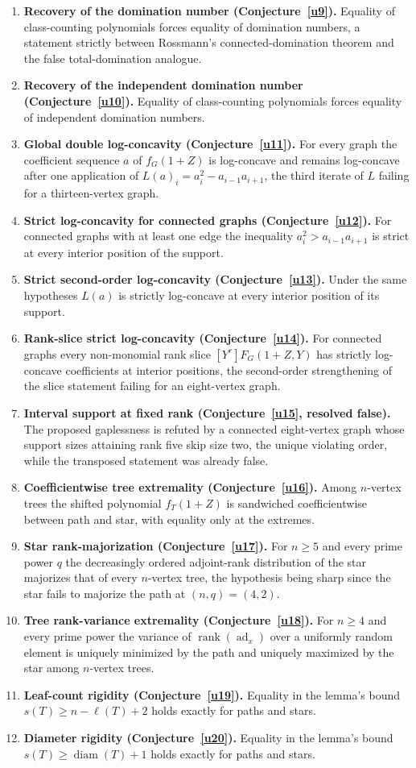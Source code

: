 \documentclass[11pt]{article}
\theoremstyle{definition}
\newcommand{\rank}{\operatorname{rank}}
\begin{document}
\begin{enumerate}
\item \textbf{Recovery of the domination number (Conjecture~\ref{u9}).}  Equality of class-counting polynomials forces equality of domination numbers, a statement strictly between Rossmann's connected-domination theorem and the false total-domination analogue.
\item \textbf{Recovery of the independent domination number (Conjecture~\ref{u10}).}  Equality of class-counting polynomials forces equality of independent domination numbers.
\item \textbf{Global double log-concavity (Conjecture~\ref{u11}).}  For every graph the coefficient sequence $a$ of $f_G(1+Z)$ is log-concave and remains log-concave after one application of $L(a)_i=a_i^2-a_{i-1}a_{i+1}$, the third iterate of $L$ failing for a thirteen-vertex graph.
\item \textbf{Strict log-concavity for connected graphs (Conjecture~\ref{u12}).}  For connected graphs with at least one edge the inequality $a_i^2>a_{i-1}a_{i+1}$ is strict at every interior position of the support.
\item \textbf{Strict second-order log-concavity (Conjecture~\ref{u13}).}  Under the same hypotheses $L(a)$ is strictly log-concave at every interior position of its support.
\item \textbf{Rank-slice strict log-concavity (Conjecture~\ref{u14}).}  For connected graphs every non-monomial rank slice $[Y^r]F_G(1+Z,Y)$ has strictly log-concave coefficients at interior positions, the second-order strengthening of the slice statement failing for an eight-vertex graph.
\item \textbf{Interval support at fixed rank (Conjecture~\ref{u15}, resolved false).}  The proposed gaplessness is refuted by a connected eight-vertex graph whose support sizes attaining rank five skip size two, the unique violating order, while the transposed statement was already false.
\item \textbf{Coefficientwise tree extremality (Conjecture~\ref{u16}).}  Among $n$-vertex trees the shifted polynomial $f_T(1+Z)$ is sandwiched coefficientwise between path and star, with equality only at the extremes.
\item \textbf{Star rank-majorization (Conjecture~\ref{u17}).}  For $n\ge5$ and every prime power $q$ the decreasingly ordered adjoint-rank distribution of the star majorizes that of every $n$-vertex tree, the hypothesis being sharp since the star fails to majorize the path at $(n,q)=(4,2)$.
\item \textbf{Tree rank-variance extremality (Conjecture~\ref{u18}).}  For $n\ge4$ and every prime power the variance of $\rank(\operatorname{ad}_x)$ over a uniformly random element is uniquely minimized by the path and uniquely maximized by the star among $n$-vertex trees.
\item \textbf{Leaf-count rigidity (Conjecture~\ref{u19}).}  Equality in the lemma's bound $s(T)\ge n-\ell(T)+2$ holds exactly for paths and stars.
\item \textbf{Diameter rigidity (Conjecture~\ref{u20}).}  Equality in the lemma's bound $s(T)\ge\operatorname{diam}(T)+1$ holds exactly for paths and stars.
\end{enumerate}
\end{document}
